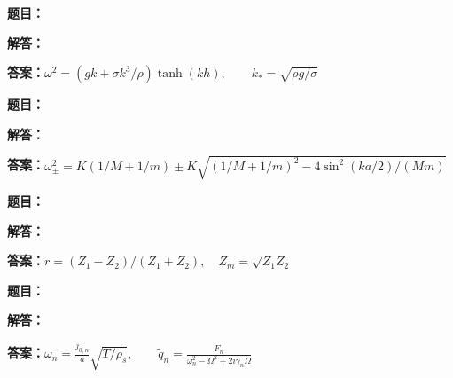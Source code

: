 \documentclass[lang=cn,color=blue,11pt]{elegantbook}
\begin{document}
\par
\noindent\textbf{题目：}
\par\noindent\textbf{解答：}
\par\noindent\textbf{答案：}\(\displaystyle \omega^2=(gk+\sigma k^3/\rho)\tanh(kh),\qquad k_*=\sqrt{\rho g/\sigma}\)\par
\par\smallskip\noindent\hrulefill\par\medskip
{}\par
\noindent\textbf{题目：}
\par\noindent\textbf{解答：}
\par\noindent\textbf{答案：}\(\displaystyle \omega_\pm^2=K(1/M+1/m)\pm K\sqrt{(1/M+1/m)^2-4\sin^2(ka/2)/(Mm)}\)\par
\par\smallskip\noindent\hrulefill\par\medskip
{}\par
\noindent\textbf{题目：}
\par\noindent\textbf{解答：}
\par\noindent\textbf{答案：}\(\displaystyle r=(Z_1-Z_2)/(Z_1+Z_2),\quad Z_m=\sqrt{Z_1Z_2}\)\par
\par\smallskip\noindent\hrulefill\par\medskip
{}\par
\noindent\textbf{题目：}
\par\noindent\textbf{解答：}
\par\noindent\textbf{答案：}\(\displaystyle \omega_n=\frac{j_{0,n}}{a}\sqrt{T/\rho_s},\qquad \tilde q_n=\frac{F_n}{\omega_n^2-\Omega^2+2i\gamma_n\Omega}\)\par
\par\smallskip\noindent\hrulefill\par\medskip
\end{document}
